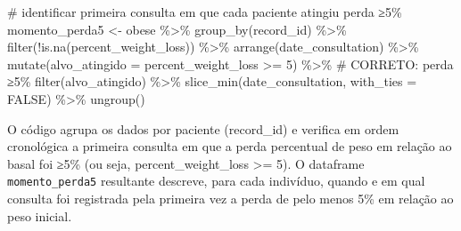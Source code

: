 \documentclass[
]{article}
\newenvironment{Shaded}{\begin{snugshade}}{\end{snugshade}}
\newcommand{\AttributeTok}[1]{\textcolor[rgb]{0.40,0.45,0.13}{#1}}
\newcommand{\CommentTok}[1]{\textcolor[rgb]{0.37,0.37,0.37}{#1}}
\newcommand{\ConstantTok}[1]{\textcolor[rgb]{0.56,0.35,0.01}{#1}}
\newcommand{\DecValTok}[1]{\textcolor[rgb]{0.68,0.00,0.00}{#1}}
\newcommand{\FunctionTok}[1]{\textcolor[rgb]{0.28,0.35,0.67}{#1}}
\newcommand{\NormalTok}[1]{\textcolor[rgb]{0.00,0.23,0.31}{#1}}
\newcommand{\OtherTok}[1]{\textcolor[rgb]{0.00,0.23,0.31}{#1}}
\newcommand{\SpecialCharTok}[1]{\textcolor[rgb]{0.37,0.37,0.37}{#1}}
\begin{document}
\begin{Shaded}
\begin{Highlighting}[]
\CommentTok{\# identificar primeira consulta em que cada paciente atingiu perda ≥5\%}
\NormalTok{momento\_perda5 }\OtherTok{\textless{}{-}}\NormalTok{ obese }\SpecialCharTok{\%\textgreater{}\%}
  \FunctionTok{group\_by}\NormalTok{(record\_id) }\SpecialCharTok{\%\textgreater{}\%}
  \FunctionTok{filter}\NormalTok{(}\SpecialCharTok{!}\FunctionTok{is.na}\NormalTok{(percent\_weight\_loss)) }\SpecialCharTok{\%\textgreater{}\%}
  \FunctionTok{arrange}\NormalTok{(date\_consultation) }\SpecialCharTok{\%\textgreater{}\%}
  \FunctionTok{mutate}\NormalTok{(}\AttributeTok{alvo\_atingido =}\NormalTok{ percent\_weight\_loss }\SpecialCharTok{\textgreater{}=} \DecValTok{5}\NormalTok{) }\SpecialCharTok{\%\textgreater{}\%}  \CommentTok{\# CORRETO: perda ≥5\%}
  \FunctionTok{filter}\NormalTok{(alvo\_atingido) }\SpecialCharTok{\%\textgreater{}\%}
  \FunctionTok{slice\_min}\NormalTok{(date\_consultation, }\AttributeTok{with\_ties =} \ConstantTok{FALSE}\NormalTok{) }\SpecialCharTok{\%\textgreater{}\%}
  \FunctionTok{ungroup}\NormalTok{()}
\end{Highlighting}
\end{Shaded}

O código agrupa os dados por paciente (record\_id) e verifica em ordem
cronológica a primeira consulta em que a perda percentual de peso em
relação ao basal foi ≥5\% (ou seja, percent\_weight\_loss \textgreater=
5). O dataframe \texttt{momento\_perda5} resultante descreve, para cada
indivíduo, quando e em qual consulta foi registrada pela primeira vez a
perda de pelo menos 5\% em relação ao peso inicial.
\end{document}
